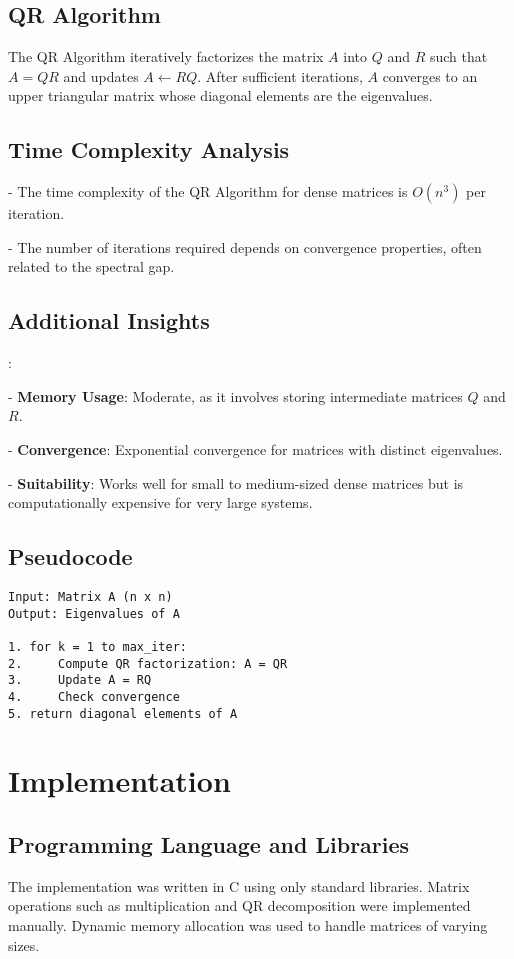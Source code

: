 \documentclass[journal]{IEEEtran}
\begin{document}
\subsection{QR Algorithm}
The QR Algorithm iteratively factorizes the matrix $A$ into $Q$ and $R$ such that $A = QR$ and updates $A \leftarrow RQ$. After sufficient iterations, $A$ converges to an upper triangular matrix whose diagonal elements are the eigenvalues.

\subsection{Time Complexity Analysis}

- The time complexity of the QR Algorithm for dense matrices is 
$O(n^3)$ per iteration.

- The number of iterations required depends on convergence properties, often related to the spectral gap.

\subsection{Additional Insights}:

- \textbf{Memory Usage}: Moderate, as it involves storing intermediate matrices 
$Q$ and $R$.

- \textbf{Convergence}: Exponential convergence for matrices with distinct eigenvalues.

- \textbf{Suitability}: Works well for small to medium-sized dense matrices but is computationally expensive for very large systems.


\subsection{Pseudocode}
\begin{verbatim}
Input: Matrix A (n x n)
Output: Eigenvalues of A

1. for k = 1 to max_iter:
2.     Compute QR factorization: A = QR
3.     Update A = RQ
4.     Check convergence
5. return diagonal elements of A
\end{verbatim}

\section{Implementation}
\subsection{Programming Language and Libraries}
The implementation was written in C using only standard libraries. Matrix operations such as multiplication and QR decomposition were implemented manually. Dynamic memory allocation was used to handle matrices of varying sizes.
\end{document}
